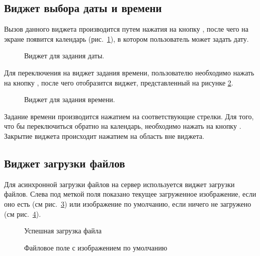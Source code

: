 \subsection{Виджет выбора даты и времени}
\label{widget:date_time_picker}
Вызов данного виджета производится путем нажатия на кнопку , после чего на экране появится календарь (рис.~\ref{img:widgets:date_time_picker_date}), в котором пользователь может задать дату.
\begin{figure}[H]
	\caption{Виджет для задания даты.}
	\label{img:widgets:date_time_picker_date}
\end{figure}

Для переключения на виджет задания времени, пользователю необходимо нажать на кнопку , после чего отобразится виджет, представленный на рисунке \ref{img:widgets:date_time_picker_time}.
\begin{figure}[H]
	\caption{Виджет для задания времени.}
	\label{img:widgets:date_time_picker_time}
\end{figure}

Задание времени производится нажатием на соответствующие стрелки. Для того, что бы переключиться обратно на календарь, необходимо нажать на кнопку . Закрытие виджета происходит нажатием на область вне виджета.
\subsection{Виджет загрузки файлов}
\label{widget:file_upload}
Для асинхронной загрузки файлов на сервер используется виджет загрузки файлов. Слева под меткой поля показано текущее загруженное изображение, если оно есть (см рис.~\ref{img:widgets:file_upload_ok}) или изображение по умолчанию, если ничего не загружено (см рис.~\ref{img:widget:file_upload_default_logo}). 

\begin{figure}[H]
	\caption{Успешная загрузка файла}
	\label{img:widgets:file_upload_ok}
\end{figure}

\begin{figure}[H]
	\caption{Файловое поле с изображением по умолчанию}
	\label{img:widget:file_upload_default_logo}
\end{figure}

